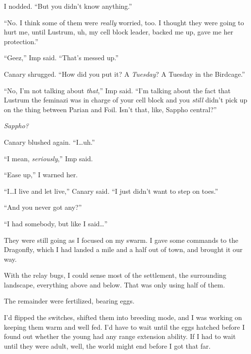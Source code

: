I nodded.  ``But you didn't know anything.''



``No.  I think some of them were \emph{really} worried, too.  I thought they were going to hurt me, until Lustrum, uh, my cell block leader, backed me up, gave me her protection.''



``Geez,'' Imp said.  ``That's messed up.''



Canary shrugged.  ``How did you put it?  A \emph{Tuesday}?  A Tuesday in the Birdcage.''



``No, I'm not talking about \emph{that},'' Imp said.  ``I'm talking about the fact that Lustrum the feminazi was in charge of your cell block and you \emph{still} didn't pick up on the thing between Parian and Foil.  Isn't that, like, Sappho central?''



\emph{Sappho?}



Canary blushed again.  ``I\ldots uh.''



``I mean, \emph{seriously},'' Imp said.



``Ease up,'' I warned her.



``I\ldots I live and let live,'' Canary said.  ``I just didn't want to step on toes.''



``And you never got any?''



``I had somebody, but like I said\ldots''



They were still going as I focused on my swarm.  I gave some commands to the Dragonfly, which I had landed a mile and a half out of town, and brought it our way.



With the relay bugs, I could sense most of the settlement, the surrounding landscape, everything above and below.  That was only using half of them.



The remainder were fertilized, bearing eggs.



I'd flipped the switches, shifted them into breeding mode, and I was working on keeping them warm and well fed.  I'd have to wait until the eggs hatched before I found out whether the young had any range extension ability.  If I had to wait until they were adult, well, the world might end before I got that far.




